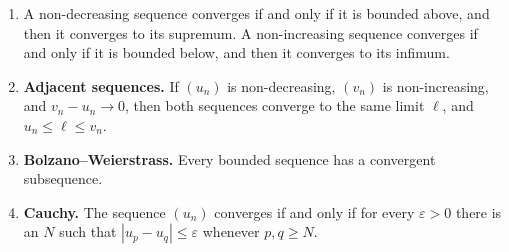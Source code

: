 \begin{proposition}\label{prop:seqcrit}
\begin{enumerate}[label=(\alph*)]
\item A non-decreasing sequence converges if and only if it is bounded above, and then it converges to its supremum. A non-increasing sequence converges if and only if it is bounded below, and then it converges to its infimum.
\item \textbf{Adjacent sequences.} If $(u_n)$ is non-decreasing, $(v_n)$ is non-increasing, and $v_n-u_n\to0$, then both sequences converge to the same limit $\ell$, and $u_n\le\ell\le v_n$.
\item \textbf{Bolzano--Weierstrass.} Every bounded sequence has a convergent subsequence.
\item \textbf{Cauchy.} The sequence $(u_n)$ converges if and only if for every $\varepsilon>0$ there is an $N$ such that $|u_p-u_q|\le\varepsilon$ whenever $p,q\ge N$.
\end{enumerate}
\end{proposition}
